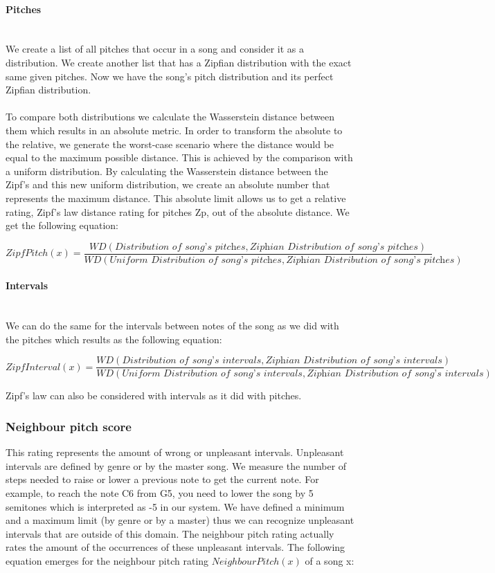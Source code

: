 \documentclass[a4paper]{article}
\begin{document}
\paragraph{Pitches}\mbox{}\\
We create a list of all pitches that occur in a song and consider it as a distribution. We create another list that has a Zipfian distribution with the exact same given pitches. Now we have the song's pitch distribution and its perfect Zipfian distribution. 
\\\\
To compare both distributions we calculate the Wasserstein distance between them which results in an absolute metric. In order to transform the absolute to the relative, we generate the worst-case scenario where the distance would be equal to the maximum possible distance. This is achieved by the comparison with a uniform distribution. By calculating the Wasserstein distance between the Zipf's and this new uniform distribution, we create an absolute number that represents the maximum distance. This absolute limit allows us to get a relative rating, Zipf's law distance rating for pitches Zp, out of the absolute distance. 
We get the following equation:

\[ ZipfPitch(x) =  \frac{WD(\textit{Distribution of song's pitches},\textit{Ziphian Distribution of song's pitches})}{WD(\textit{Uniform Distribution of song's pitches},\textit{Ziphian Distribution of song's pitches})} \]


\paragraph{Intervals}\mbox{}\\
We can do the same for the intervals between notes of the song as we did with the pitches which results as the following equation:

\[ ZipfInterval(x) =  \frac{WD(\textit{Distribution of song's intervals},\textit{Ziphian Distribution of song's intervals})}{WD(\textit{Uniform Distribution of song's intervals},\textit{Ziphian Distribution of song's intervals})} \]

Zipf's law can also be considered with intervals as it did with pitches.


\subsubsection{Neighbour pitch score}\label{sec:rater:neighbourpitch}
This rating represents the amount of wrong or unpleasant intervals. Unpleasant intervals are defined by genre or by the master song. We measure the number of steps needed to raise or lower a previous note to get the current note. For example, to reach the note C6 from G5, you need to lower the song by 5 semitones which is interpreted as -5 in our system. We have defined a minimum and a maximum limit (by genre or by a master) thus we can recognize unpleasant intervals that are outside of this domain. The neighbour pitch rating actually rates the amount of the occurrences of these unpleasant intervals. The following equation emerges for the neighbour pitch rating $ NeighbourPitch(x) $ of a song x:
\end{document}
